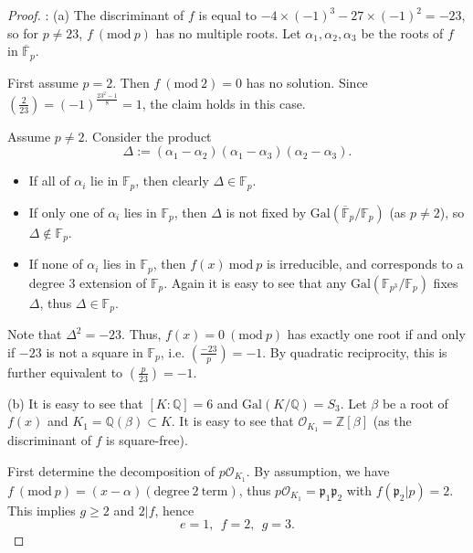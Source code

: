 \documentclass[a4paper,12pt,leqno]{article}
\theoremstyle{definition}
\newcommand{\cO}{\mathcal{O}}
\newcommand{\legendre}[2]{\genfrac{(}{)}{}{}{#1}{#2}}
\begin{document}
\begin{proof}: (a) The discriminant of $f$ is equal to $-4\times (-1)^3-27\times (-1)^2=-23$, so for $p\neq 23$, $f\ (\mathrm{mod}\ p)$ has no multiple roots. Let $\alpha_1,\alpha_2,\alpha_3$ be the  roots of $f$ in $\overline{\mathbb{F}}_p$. 

First assume $p=2$. Then $f\ (\mathrm{mod}\ 2)=0$ has no solution. Since $\legendre{2}{23}=(-1)^{\frac{23^2-1}{8}}=1$, the claim holds in this case.

Assume $p\neq 2$. Consider the product
\[\Delta:=(\alpha_1-\alpha_2)(\alpha_1-\alpha_3)(\alpha_2-\alpha_3).\]
\begin{itemize}
\item If all of $\alpha_i$ lie in $\mathbb{F}_p$, then clearly $\Delta\in\mathbb{F}_p$. 
\item If only one of $\alpha_i$ lies in $\mathbb{F}_p$, then $\Delta$ is not fixed by  $\mathrm{Gal}(\overline{\mathbb{F}}_p/\mathbb{F}_p)$ (as $p\neq 2$), so $\Delta\notin\mathbb{F}_p$.
\item If none of $\alpha_i$ lies in $\mathbb{F}_p$, then $f(x)\ \mathrm{mod}\ p$ is irreducible, and corresponds to a degree $3$ extension of $\mathbb{F}_p$. Again it is easy to see that any $\mathrm{Gal}(\mathbb{F}_{p^3}/\mathbb{F}_p)$ fixes $\Delta$, thus $\Delta\in \mathbb{F}_p$. 
\end{itemize}
Note that $\Delta^2=-23$.  
Thus, $f(x)=0\ (\mathrm{mod}\ p)$ has exactly one root if and only if $-23$ is not a square in $\mathbb{F}_p$, i.e. $\legendre{-23}{p}=-1$. By quadratic reciprocity, this is further equivalent to $\legendre{p}{23}=-1$. 
 
(b)  It is easy to see that $[K:\mathbb{Q}]=6$ and $\mathrm{Gal}(K/\mathbb{Q})=S_3$.  
Let $\beta$ be a root of $f(x)$ and $K_1=\mathbb{Q}(\beta)\subset K$.  It is easy to see that  $\mathcal{O}_{K_1}=\mathbb{Z}[\beta]$ (as the discriminant of $f$ is square-free). 

First determine the decomposition of $p\cO_{K_1}$.  By assumption, we have   $f\ (\mathrm{mod}\ p)=(x-\alpha)(\mathrm{degree }\ 2\ \mathrm{term})$, thus   $p\cO_{K_1}=\mathfrak{p}_1\mathfrak{p}_2$ with $f(\mathfrak{p}_2|p)=2$. This implies   $g\geq 2$ and $2|f$, hence \[e=1,\ \ f=2,\ \  g=3.\]   
\end{proof}

 
\end{document}
